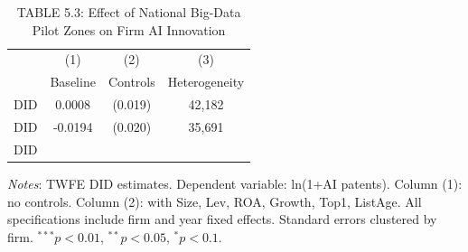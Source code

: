 \begin{table}[htbp]
\caption{TABLE 5.3: Effect of National Big-Data Pilot Zones on Firm AI Innovation}
\label{tab:cs3-bd}
\centering

\begin{threeparttable}
\begin{tabular}{lccc}
\toprule
                               & \multicolumn{1}{c}{(1)} & \multicolumn{1}{c}{(2)} & \multicolumn{1}{c}{(3)} \\
                               & \multicolumn{1}{c}{Baseline} & \multicolumn{1}{c}{Controls} & \multicolumn{1}{c}{Heterogeneity} \\
\midrule
  DID & 0.0008 & (0.019) & 42,182 \\
  DID & -0.0194 & (0.020) & 35,691 \\
  DID &  &  &  \\
\midrule
\bottomrule
\end{tabular}
\begin{tablenotes}
\item \textit{Notes}: TWFE DID estimates. Dependent variable: ln(1+AI patents). Column (1): no controls. Column (2): with Size, Lev, ROA, Growth, Top1, ListAge. All specifications include firm and year fixed effects. Standard errors clustered by firm. $^{***}p<0.01$, $^{**}p<0.05$, $^{*}p<0.1$.
\end{tablenotes}
\end{threeparttable}
\end{table}

